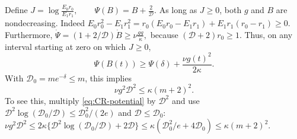 Define
 $J=\log\frac{E_0r_0}{E_1r_1},\qquad \Psi(B)=B+\frac{2}{\mathcal D}.$ 
As long as $J\ge0$, both $g$ and $B$ are nondecreasing. Indeed
 $E_0r_0^2-E_1r_1^2 =r_0(E_0r_0-E_1r_1)+E_1r_1(r_0-r_1)\ge0.$ 
Furthermore,
 $\dot \Psi=(1+2/\mathcal D)\dot B\ge\nu\frac{g\dot g}{\kappa},$ 
because $(\mathcal D+2)r_0\ge1$. Thus, on any interval starting at zero on which $J\ge0$,
\begin{equation}
 \Psi(B(t))\ge \Psi(\delta)+\frac{\nu g(t)^2}{2\kappa}.
 \label{eq:CR-potential}
\end{equation}
With $\mathcal D_0=me^{-\delta}\le m$, this implies
\begin{equation}
 \nu g^2\mathcal D^2\le\kappa(m+2)^2.
 \label{eq:CR-budget}
\end{equation}
To see this, multiply \eqref{eq:CR-potential} by $\mathcal D^2$ and use
$\mathcal D^2\log(\mathcal D_0/\mathcal D)\le \mathcal D_0^2/(2e)$ and $\mathcal D\le \mathcal D_0$:
 $\nu g^2\mathcal D^2\le2\kappa\{\mathcal D^2\log(\mathcal D_0/\mathcal D)+2\mathcal D\} \le\kappa(\mathcal D_0^2/e+4\mathcal D_0)\le\kappa(m+2)^2.$ 

